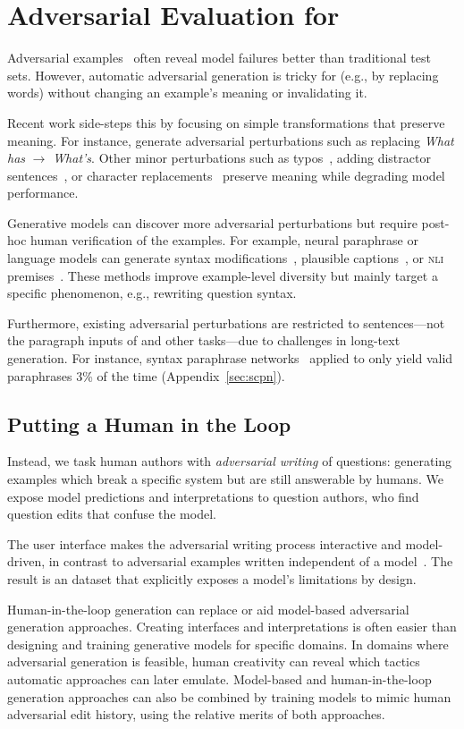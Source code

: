 \section{Adversarial Evaluation for }
\label{sec:recent}

Adversarial examples~\cite{szegedy2013-intriguing} often reveal
model failures better than traditional test sets. However, automatic
adversarial generation is tricky for  (e.g., by replacing words) without
changing an example's meaning or invalidating it.

Recent work side-steps this by focusing on simple
transformations that preserve meaning. For instance,
\citet{ribeiro2018sear} generate adversarial
perturbations such as replacing \emph{What has} $\to$
\emph{What's}. Other minor perturbations such as
typos~\cite{belinkov2018synthetic}, adding distractor
sentences~\cite{jia2017adversarial,mudrakarta2018understand}, or
character replacements~\cite{ebrahimi2017hotflip} preserve meaning
while degrading model performance.

Generative models can discover more adversarial perturbations but
require post-hoc human verification of the examples.
For example, neural paraphrase or language models can
generate syntax modifications~\cite{iyyerscpn2018}, plausible
captions~\cite{zellers2018swag}, or \textsc{nli}
premises~\cite{zhao2017generating}. These methods improve
example-level diversity but mainly target a specific phenomenon, e.g.,
rewriting question syntax.

Furthermore, existing adversarial perturbations are restricted to sentences---not the
paragraph inputs of \qb{} and other
tasks---due to challenges in long-text generation. For instance,
syntax paraphrase networks~\cite{iyyerscpn2018} applied to \qb{} only
yield valid paraphrases 3\% of the time (Appendix~\ref{sec:scpn}).

\subsection{Putting a Human in the Loop}\label{sec:loop}

Instead, we task human authors with \emph{adversarial writing} of questions:
generating examples which break a specific  system but
are still answerable by humans. We expose model predictions and
interpretations to question authors, who find question edits that confuse the model. 

The user interface makes the adversarial writing process interactive and
model-driven, in contrast to adversarial examples written independent of a model~\cite{ettinger2017towards}. The result is an \challenge{} dataset that explicitly exposes a model's limitations by design.

Human-in-the-loop generation can replace or aid model-based
adversarial generation approaches. Creating
interfaces and interpretations is often easier than designing and
training generative models for specific domains. In domains where
adversarial generation is feasible, human creativity
can reveal which tactics automatic approaches can
later emulate. Model-based and human-in-the-loop generation approaches can
also be combined by training models to mimic human adversarial edit
history, using the relative merits of both approaches.